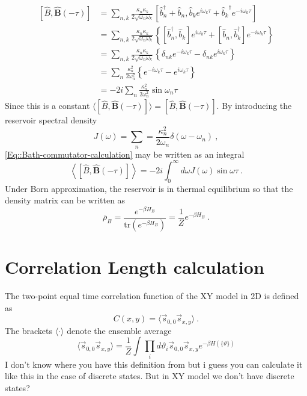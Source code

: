 	\begin{equation} \label{Eq::Bath-commutator-calculation}
		\begin{split}
			\left[\hat{B}, \boldsymbol{\hat{B}}(-\tau) \right] &=	\sum_{n,k}^{} \frac{\kappa_n \kappa_k}{2 \sqrt{\omega_n \omega_k}} \left[\hat{b}_n^\dagger + \hat{b}_n , {\hat{b}_k}e^{i \omega_k \tau} + {\hat{b}_k}^\dagger e^{-i \omega_k \tau} \right] \\
			&= \sum_{n,k}^{} \frac{\kappa_n \kappa_k}{2 \sqrt{\omega_n \omega_k}} \left\{\left[\hat{b}_n^\dagger, \hat{b}_k\right] e^{i\omega_k \tau} + \left[\hat{b}_n, \hat{b}_k^\dagger\right] e^{-i\omega_k \tau}\right\} \\
			&= \sum_{n,k}^{} \frac{\kappa_n \kappa_k}{2 \sqrt{\omega_n \omega_k}} \left\{\delta_{nk} e^{-i\omega_k \tau} - \delta_{nk} e^{i\omega_k \tau}\right\} \\
			&= \sum_{n}^{} \frac{\kappa_n^2 }{2 {\omega_n^2}} \left\{e^{-i\omega_k \tau} - e^{i\omega_k \tau}\right\} \\
			&= - 2 i  \sum_{n}^{} \frac{\kappa_n^2 }{2 {\omega_n^2}} \sin \omega_n \tau 
		\end{split}
	\end{equation}
	Since this is a constant $\langle [\hat{B}, \boldsymbol{\hat{B}}(-\tau) ]  \rangle =	[\hat{B}, \boldsymbol{\hat{B}}(-\tau) ]$. By introducing the reservoir spectral density 
	\begin{equation}
		J(\omega) =	\sum_n =	\frac{\kappa_n^2}{2 \omega_n} \delta(\omega - \omega_n)~,
	\end{equation}
	\autoref{Eq::Bath-commutator-calculation} may be written as an integral
	\begin{equation}
		\left\langle \left[\hat{B}, \boldsymbol{\hat{B}}(-\tau) \right] \right \rangle = -2i \int_{0}^{\infty} d\omega J(\omega) \sin \omega \tau~.
	\end{equation}
	Under Born approximation, the reservoir is in thermal equilibrium so that the density matrix can be written as
	\begin{equation}
		\overline{\rho}_B =	\frac{e^{-\beta H_B}}{\text{tr}\left(e^{-\beta H_B}\right)}=\frac{1}{Z} e^{-\beta H_B}~.
	\end{equation}
	\section{Correlation Length calculation} \label{Section::Corr-Lenght-Calculation}	
	The two-point equal time correlation function of the XY model in 2D is defined as
	\begin{equation}
		C(x, y) = \langle \vec{s}_{0,0} \vec{s}_{x, y} \rangle ~.
	\end{equation}
	The brackets $\langle \cdot \rangle$ denote the ensemble average
	\begin{equation}
		\langle \vec{s}_{0,0} \vec{s}_{x, y} \rangle  = \frac{1}{Z} \int \prod_i d\vartheta_i \vec{s}_{0,0} \vec{s}_{x, y} e^{- \beta H(\{\vartheta\})}
	\end{equation}
	I don't know where you have this definition from but i guess you can calculate it like this in the case of discrete states. But in XY model we don't have discrete states?
	
